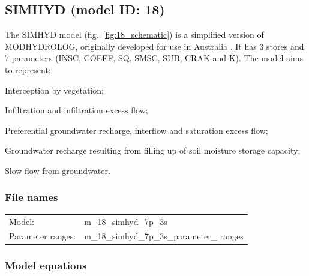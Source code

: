 \subsection{SIMHYD (model ID: 18)}
The SIMHYD model (fig.~\ref{fig:18_schematic}) is a simplified version of MODHYDROLOG, originally developed for use in Australia \citep{Chiew2002}. It has 3 stores and 7 parameters (INSC, COEFF, SQ, SMSC, SUB, CRAK and K). The model aims to represent:

\begin{itemizecompact}
\item Interception by vegetation;
\item Infiltration and infiltration excess flow;
\item Preferential groundwater recharge, interflow and saturation excess flow;
\item Groundwater recharge resulting from filling up of soil moisture storage capacity;
\item Slow flow from groundwater.
\end{itemizecompact}

\subsubsection{File names}
\begin{tabular}{@{}ll}
Model: &m\_18\_simhyd\_7p\_3s \\
Parameter ranges: &m\_18\_simhyd\_7p\_3s\_parameter\_ ranges \\
\end{tabular}

\subsubsection{Model equations}

